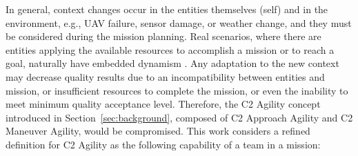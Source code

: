 
In general, context changes occur in the entities themselves (self) and in the environment, e.g., UAV failure, sensor damage, or weather change, and they must be considered during the mission planning.
Real scenarios, where there are entities applying the available resources to accomplish a mission or to reach a goal, naturally have embedded dynamism \citep{Alberts2000, Alberts2006}. Any adaptation to the new context may decrease quality results due to an incompatibility between entities and mission, or insufficient resources to complete the mission, or even the inability to meet minimum quality acceptance level. Therefore, the C2 Agility concept introduced in Section~\ref{sec:background}, composed of C2 Approach Agility and C2 Maneuver Agility, would be compromised. This work considers a refined definition for C2 Agility as the following capability of a team in a mission:

\begin{center}
\end{center}


